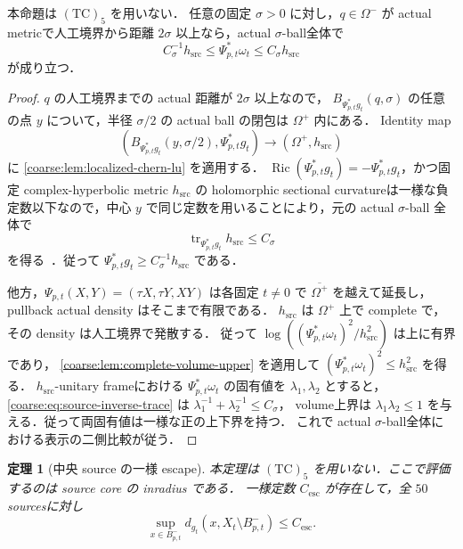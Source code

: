 \documentclass[a4paper,11pt]{ltjsarticle}
\numberwithin{equation}{section}
\theoremstyle{plain}
\newtheorem{theorem}{定理}[section]
\theoremstyle{definition}
\theoremstyle{remark}
\newcommand{\Ric}{\operatorname{Ric}}\newcommand{\tr}{\operatorname{tr}}\newcommand{\osc}{\operatorname{osc}}\newcommand{\vol}{\operatorname{Vol}}
\begin{document}
\begin{proposition}\label{coarse:prop:deep-source}
本命題は $\mathrm{(TC)}_5$ を用いない．
任意の固定 $\sigma>0$ に対し，$q\in\Omega^-$ が actual metricで人工境界から距離 $2\sigma$ 以上なら，actual $\sigma$-ball全体で
\[
 C_\sigma^{-1}h_{\mathrm{src}}
 \le\Psi_{p,t}^*\omega_t
 \le C_\sigma h_{\mathrm{src}}
\]
が成り立つ．
\end{proposition}

\begin{proof}
$q$ の人工境界までの actual 距離が $2\sigma$ 以上なので，
$B_{\Psi_{p,t}^*g_t}(q,\sigma)$ の任意の点 $y$ について，半径 $\sigma/2$ の actual ball の閉包は $\Omega^+$ 内にある．
Identity map
\[
 (B_{\Psi_{p,t}^*g_t}(y,\sigma/2),\Psi_{p,t}^*g_t)
 \longrightarrow (\Omega^+,h_{\mathrm{src}})
\]
に \cref{coarse:lem:localized-chern-lu} を適用する．
$\Ric(\Psi_{p,t}^*g_t)=-\Psi_{p,t}^*g_t$，かつ固定 complex-hyperbolic metric
$h_{\mathrm{src}}$ の holomorphic sectional curvatureは一様な負定数以下なので，中心 $y$ で同じ定数を用いることにより，元の actual $\sigma$-ball 全体で
\begin{equation}\label{coarse:eq:source-inverse-trace}
 \tr_{\Psi_{p,t}^*g_t}h_{\mathrm{src}}\le C_\sigma
\end{equation}
を得る~\cite{Royden,Yau}．従って
$\Psi_{p,t}^*g_t\ge C_\sigma^{-1}h_{\mathrm{src}}$ である．

他方，$\Psi_{p,t}(X,Y)=(\tau X,\tau Y,XY)$ は各固定 $t\ne0$ で
$\overline{\Omega^+}$ を越えて延長し，pullback actual density はそこまで有限である．
$h_{\mathrm{src}}$ は $\Omega^+$ 上で complete で，その density は人工境界で発散する．
従って $\log((\Psi_{p,t}^*\omega_t)^2/h_{\mathrm{src}}^2)$ は上に有界であり，
\cref{coarse:lem:complete-volume-upper} を適用して
$(\Psi_{p,t}^*\omega_t)^2\le h_{\mathrm{src}}^2$ を得る．
$h_{\mathrm{src}}$-unitary frameにおける
$\Psi_{p,t}^*\omega_t$ の固有値を $\lambda_1,\lambda_2$ とすると，
\eqref{coarse:eq:source-inverse-trace} は $\lambda_1^{-1}+\lambda_2^{-1}\le C_\sigma$，
volume上界は $\lambda_1\lambda_2\le1$ を与える．従って両固有値は一様な正の上下界を持つ．
これで actual $\sigma$-ball全体における表示の二側比較が従う．
\end{proof}

\begin{theorem}[中央 source の一様 escape]\label{coarse:thm:source-escape}
本定理は $\mathrm{(TC)}_5$ を用いない．ここで評価するのは source core の inradius である．
一様定数 $C_{\mathrm{esc}}$ が存在して，全 $50$ sourcesに対し
\begin{equation}\label{coarse:eq:source-escape}
 \sup_{x\in B_{p,t}^-}d_{g_t}(x,X_t\setminus B_{p,t}^-)\le C_{\mathrm{esc}}.
\end{equation}
\end{theorem}
\end{document}
